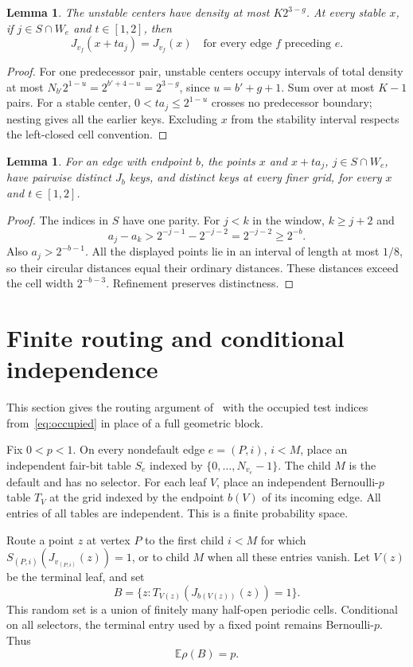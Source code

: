 \documentclass[11pt]{article}
\newtheorem{lemma}[theorem]{Lemma}
\theoremstyle{remark}\newtheorem{remark}[theorem]{Remark}
\newcommand{\E}{\mathbb E}\newcommand{\ind}{\mathbf 1}
\begin{document}
\begin{lemma}\label{lem:stable}
The unstable centers have density at most $K2^{3-g}$. At every stable $x$, if $j\in S\cap W_e$ and $t\in[1,2]$, then
\[
 J_{v_f}(x+t a_j)=J_{v_f}(x)
 \quad\text{for every edge }f\text{ preceding }e.
\]
\end{lemma}
\begin{proof}
For one predecessor pair, unstable centers occupy intervals of total density at most
$N_{b'}2^{1-u}=2^{b'+4-u}=2^{3-g}$, since $u=b'+g+1$. Sum over at most $K-1$ pairs. For a stable center, $0<t a_j\le2^{1-u}$ crosses no predecessor boundary; nesting gives all the earlier keys. Excluding $x$ from the stability interval respects the left-closed cell convention.
\end{proof}

\begin{lemma}\label{lem:separation}
For an edge with endpoint $b$, the points $x$ and $x+t a_j$, $j\in S\cap W_e$, have pairwise distinct $J_b$ keys, and distinct keys at every finer grid, for every $x$ and $t\in[1,2]$.
\end{lemma}
\begin{proof}
The indices in $S$ have one parity. For $j<k$ in the window, $k\ge j+2$ and
\[
 a_j-a_k>2^{-j-1}-2^{-j-2}=2^{-j-2}\ge2^{-b}.
\]
Also $a_j>2^{-b-1}$. All the displayed points lie in an interval of length at most $1/8$, so their circular distances equal their ordinary distances. These distances exceed the cell width $2^{-b-3}$. Refinement preserves distinctness.
\end{proof}

\section{Finite routing and conditional independence}
This section gives the routing argument of~\cite{OpenAI084} with the occupied test indices from~\eqref{eq:occupied} in place of a full geometric block.

Fix $0<p<1$. On every nondefault edge $e=(P,i)$, $i<M$, place an independent fair-bit table $S_e$ indexed by $\{0,\ldots,N_{v_e}-1\}$. The child $M$ is the default and has no selector. For each leaf $V$, place an independent Bernoulli-$p$ table $T_V$ at the grid indexed by the endpoint $b(V)$ of its incoming edge. All entries of all tables are independent. This is a finite probability space.

Route a point $z$ at vertex $P$ to the first child $i<M$ for which $S_{(P,i)}(J_{v_{(P,i)}}(z))=1$, or to child $M$ when all these entries vanish. Let $V(z)$ be the terminal leaf, and set
\[
 B=\{z:T_{V(z)}(J_{b(V(z))}(z))=1\}.
\]
This random set is a union of finitely many half-open periodic cells. Conditional on all selectors, the terminal entry used by a fixed point remains Bernoulli-$p$. Thus
\begin{equation}\label{eq:mean}
 \E\rho(B)=p.
\end{equation}
\end{document}
